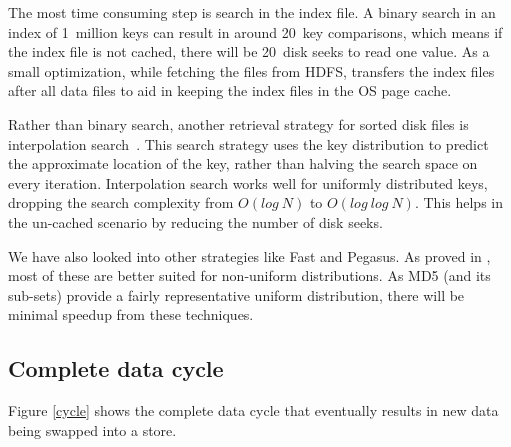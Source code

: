 The most time consuming step is search in the index file. A binary
search in an index of 1~million keys can result in around 20~key
comparisons, which means if the index file is not cached, there will be
20~disk seeks to read one value. As a small optimization, while
fetching the files from HDFS, \projectname{} transfers the index files
after all data files to aid in keeping the index files in the OS page
cache.

Rather than binary search, another retrieval strategy for sorted disk
files is interpolation search~\cite{manolopoulos}. This search
strategy uses the key distribution to predict the approximate location
of the key, rather than halving the search space on every iteration.
Interpolation search works well for uniformly distributed keys,
dropping the search complexity from $O(log~N)$ to $O(log~log~N)$. This
helps in the un-cached scenario by reducing the number of disk seeks.

We have also looked into other strategies like Fast and Pegasus. As
proved in \citet{manolopoulos}, most of these are better suited for
non-uniform distributions. As MD5 (and its sub-sets) provide a fairly
representative uniform distribution, there will be minimal speedup
from these techniques.


\subsection{Complete data cycle}
\label{sec:read_only:data_cycle}

Figure \ref{cycle} shows the complete data cycle that eventually
results in new data being swapped into a \projectname{} store. 

